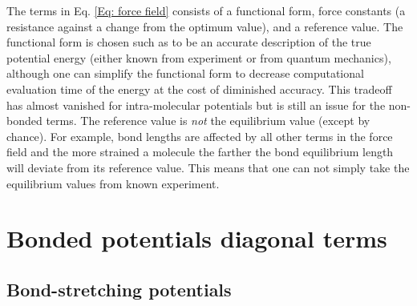 The terms in Eq. \ref{Eq: force field} consists of a functional form, force constants
(a resistance against a change from the optimum value), and a reference value.
The functional form is chosen such as to be an accurate description of the true potential energy (either
known from experiment or from quantum mechanics), although one can simplify the functional form to decrease
computational evaluation time of the energy at the cost of diminished accuracy. This tradeoff has almost vanished
for intra-molecular potentials but is still an issue for the non-bonded terms.
The reference value is \emph{not} the equilibrium value (except by chance).
For example, bond lengths are affected by all other terms in the force field and the more strained a molecule
the farther the bond equilibrium length will deviate from its reference value. This means that one can not simply
take the equilibrium values from known experiment.

\section{Bonded potentials diagonal terms}

\subsection{Bond-stretching potentials}

